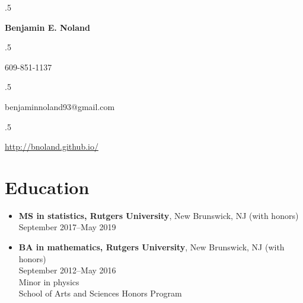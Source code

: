 \documentclass[letterpaper,12pt]{article}
\begin{document}
\moveleft.5\hoffset\centerline{\Large\bf Benjamin E. Noland}
\smallskip
\moveleft.5\hoffset\centerline{609-851-1137}
\moveleft.5\hoffset\centerline{benjaminnoland93@gmail.com}
\moveleft.5\hoffset\centerline{\url{http://bnoland.github.io/}}

\section*{Education}

\begin{itemize}
\item \textbf{MS in statistics, Rutgers University}, New Brunswick, NJ
  (with honors) \\
  September 2017--May 2019

\item \textbf{BA in mathematics, Rutgers University}, New Brunswick, NJ
  (with honors) \\
  September 2012--May 2016 \\
  Minor in physics \\
  School of Arts and Sciences Honors Program
\end{itemize}

\iffalse
\subsection*{Selection of coursework:}

\begin{itemize}
\item \textbf{Mathematics:} Calculus, linear algebra, ordinary
  differential equations, real analysis, complex variables,
  differential geometry, linear programming, abstract algebra,
  topology \textit{(taken at Rutgers University)}

\item \textbf{Physics:} Classical mechanics, electromagnetism,
  astrophysics \textit{(taken at Rutgers University)}

\item \textbf{Computer science:} Systems programming, data structures
  and algorithms \textit{(taken at Princeton University while in high
    school)}; Advanced Placement computer science \textit{(taken in
    high school)}

\item \textbf{Statistics:} Advanced Placement statistics
  \textit{(taken in high school)}, probability theory, regression
  analysis \textit{(taking at Rutgers University)}

\end{itemize}
\fi
\end{document}
